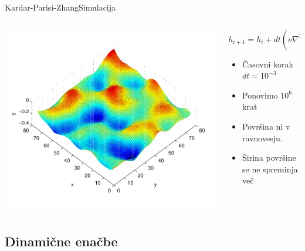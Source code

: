 \documentclass{beamer}
\begin{document}
\begin{frame}{Kardar-Parisi-Zhang}{Simulacija}
\begin{columns}
  \begin{column}{0.70\textwidth}
    \hspace*{-0.12\textwidth}\includegraphics[width=1.25\textwidth]{slike/KPZ-numericno}
  \end{column}
  \tiny{}
  \begin{column}{0.4\textwidth}
    \begin{equation} h_{i+1} = h_i + dt (\nu \nabla^2 h + \frac{\lambda}{2} (\nabla h)^2 + \eta (\mathbf{x},t)) \end{equation}
    \newline
    \begin{itemize}
      \item
        Časovni korak $dt = 10^{-3}$
      \item
        Ponovimo $10^6$ krat
      \item
        Površina ni v ravnovesju.
      \item
       Širina površine se ne spreminja več
    \end{itemize}

  \end{column}
\end{columns}
\end{frame}


\subsection{Dinamične enačbe}
\end{document}

